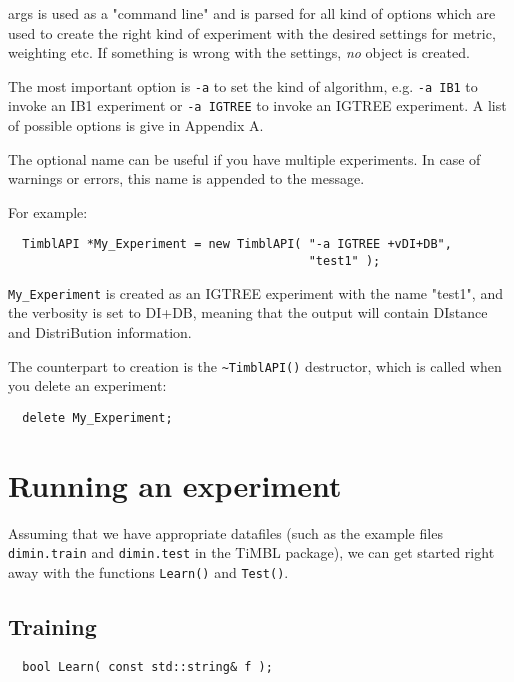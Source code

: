 \documentclass{report}
\begin{document}
args is used as a "command line" and is parsed for all kind of options
which are used to create the right kind of experiment with the desired
settings for metric, weighting etc. If something is wrong with the
settings, {\em no}\/ object is created.

The most important option is {\tt -a}  to set the kind of algorithm,
e.g. {\tt -a IB1} to invoke an IB1 experiment or {\tt -a IGTREE} to invoke an IGTREE
experiment. A list of possible options is give in Appendix A.

The optional name can be useful if you have multiple experiments.
In case of warnings or errors, this name is appended to the message.

For example:

\begin{footnotesize}
\begin{verbatim}
  TimblAPI *My_Experiment = new TimblAPI( "-a IGTREE +vDI+DB", 
                                          "test1" );
\end{verbatim}
\end{footnotesize}

{\tt My\_Experiment} is created as an IGTREE experiment with the name
"test1", and the verbosity is set to DI+DB, meaning that the output
will contain DIstance and DistriBution information.

The counterpart to creation is the {\tt \~{ }TimblAPI()} destructor,
which is called when you delete an experiment:

\begin{footnotesize}
\begin{verbatim}
  delete My_Experiment;
\end{verbatim}
\end{footnotesize}

\section{Running an experiment}

Assuming that we have appropriate datafiles (such as the example files {\tt
dimin.train} and {\tt dimin.test} in the TiMBL package), we can get
started right away with the functions {\tt Learn()} and {\tt Test()}.

\subsection{Training}
\begin{footnotesize}
\begin{verbatim}
  bool Learn( const std::string& f );
\end{verbatim}
\end{footnotesize}
\end{document}
